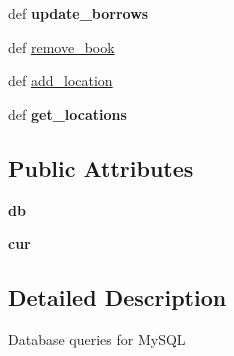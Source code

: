 \begin{DoxyCompactItemize}
\item 
\hypertarget{classsrc_1_1db__queries_1_1mysql_a45315e123c76e4c4de48e0a1000ed5cd}{
def {\bfseries update\_\-borrows}}
\label{classsrc_1_1db__queries_1_1mysql_a45315e123c76e4c4de48e0a1000ed5cd}

\item 
def \hyperlink{classsrc_1_1db__queries_1_1mysql_a509a11d18bc82adec8fe933b48bafc0d}{remove\_\-book}
\item 
def \hyperlink{classsrc_1_1db__queries_1_1mysql_a986b525715ffc14ee62dd88c765a3e99}{add\_\-location}
\item 
\hypertarget{classsrc_1_1db__queries_1_1mysql_af3e7c289f7f9cac42cf9aca0b766a878}{
def {\bfseries get\_\-locations}}
\label{classsrc_1_1db__queries_1_1mysql_af3e7c289f7f9cac42cf9aca0b766a878}

\end{DoxyCompactItemize}
\subsection*{Public Attributes}
\begin{DoxyCompactItemize}
\item 
\hypertarget{classsrc_1_1db__queries_1_1mysql_a2585bb5a967b8cfb1f1a3f18cc2d799a}{
{\bfseries db}}
\label{classsrc_1_1db__queries_1_1mysql_a2585bb5a967b8cfb1f1a3f18cc2d799a}

\item 
\hypertarget{classsrc_1_1db__queries_1_1mysql_a2f4f0a22d3217c2902d030a2d6300b68}{
{\bfseries cur}}
\label{classsrc_1_1db__queries_1_1mysql_a2f4f0a22d3217c2902d030a2d6300b68}

\end{DoxyCompactItemize}


\subsection{Detailed Description}
\begin{DoxyVerb}
Database queries for MySQL

\end{DoxyVerb}
 

